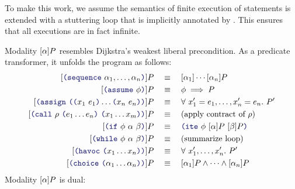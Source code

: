 \documentclass[runningheads]{llncs}
\begin{document}
To make this work, we assume the semantics of finite execution of statements
is extended with a stuttering loop that is implicitly annotated by
 .
This ensures that all executions are in fact infinite.

Modality $[\alpha]P$ resembles Dijkstra's weakest liberal precondition.
As a predicate transformer, it unfolds the program as follows:
\begin{align*}
\BOX{\LP \terminal{sequence}~ \alpha_1, \dots, \alpha_n \RP}{P}
    &\quad \equiv \quad
         \BOX{\alpha_1}{} \cdots {\BOX{\alpha_n}{P}}
    \\
\BOX{\LP \terminal{assume}~\phi \RP}{P}
    &\quad \equiv \quad
         \phi \implies P
    \\
\BOX{\LP \terminal{assign}~\LP \LP x_1~e_1 \RP \dots \LP x_n~e_n \RP \RP}{P}
    &\quad \equiv \quad
         \forall\ x'_1 = e_1, \dots, x'_n = e_n.\ P'
    \\
\BOX{\LP \terminal{call}~ \rho~ \LP e_1 \dots e_n \RP~
                               \LP x_1 \dots x_m \RP \RP}{P}
    &\quad \equiv \quad
        \text{(apply contract of $\rho$)}
    \\
\BOX{\LP \terminal{if}~\phi~\alpha~\beta \RP}{P}
    &\quad \equiv \quad
        \LP \terminal{ite}~\phi~
                \BOX{\alpha}{P}~
                \BOX{\beta}{P} \RP
    \\
\BOX{\LP \terminal{while}~\phi~\alpha~\beta \RP}{P}
    &\quad \equiv \quad
        \text{(summarize loop)}
    \\
\BOX{\LP \terminal{havoc}~\LP x_1 \dots x_n \RP \RP}{P}
    &\quad \equiv \quad
         \forall\ x'_1, \dots, x'_n.\ P'
    \\
\BOX{\LP \terminal{choice}~\LP \alpha_1 \dots \alpha_n \RP \RP}{P}
    &\quad \equiv \quad
         \BOX{\alpha_1}{P} \land \dots \land \BOX{\alpha_n}{P}
\end{align*}
Modality $[\alpha]P$ is dual:
\end{document}
